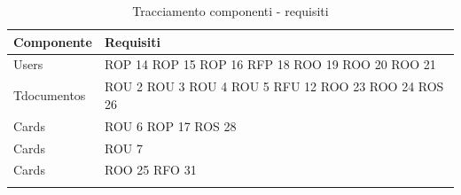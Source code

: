\begin{center}
\def\arraystretch{2}
\begin{longtable}{|p{7cm}|p{3cm}|}
\cellcolor[gray]{0.9} \textbf{Componente} & \cellcolor[gray]{0.9} \textbf{Requisiti} \\ \hline
Users & ROP 14 \newline ROP 15 \newline ROP 16 \newline RFP 18 \newline ROO 19 \newline ROO 20 \newline ROO 21 \\ \hline
Tdocumentos & ROU 2 \newline ROU 3 \newline ROU 4 \newline ROU 5 \newline RFU 12 \newline ROO 23 \newline ROO 24 \newline ROS 26 \\ \hline
Cards & ROU 6 \newline ROP 17 \newline ROS 28 \\ \hline
Cards & ROU 7 \\ \hline
Cards & ROO 25 \newline RFO 31 \\ \hline
\caption{Tracciamento componenti - requisiti}
\end{longtable}


\end{center}
